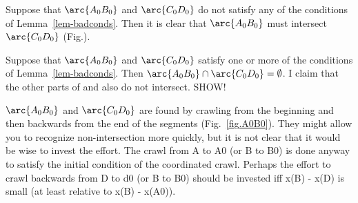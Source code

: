 {Suppose that $\arc{A_{0}B_{0}}$ and $\arc{C_{0}D_{0}}$ do not satisfy any of the 
conditions of Lemma~\ref{lem-badconds}.
Then it is clear that $\arc{A_{0}B_{0}}$ must intersect
$\arc{C_{0}D_{0}}$ (Fig.).
%
%

Suppose that $\arc{A_{0}B_{0}}$ and $\arc{C_{0}D_{0}}$ satisfy one or more of the 
conditions of Lemma~\ref{lem-badconds}.
Then $\arc{A_{0}B_{0}} \cap \arc{C_{0}D_{0}} = \emptyset$.
I claim that the other parts of  and  also do not intersect.
SHOW!
\QED

$\arc{A_{0}B_{0}}$ and $\arc{C_{0}D_{0}}$ are found by crawling from the
beginning and then backwards from the end of the segments (Fig.~\ref{fig.A0B0}).
They might allow you to recognize non-intersection more quickly, 
but it is not clear that it would be wise to invest the effort.
The crawl from A to A0 (or B to B0) is  done anyway to satisfy 
the initial condition of the coordinated crawl.
Perhaps  the effort to crawl backwards from D to d0 (or B to B0)
should be invested iff x(B) - x(D) is small (at least relative to
x(B) - x(A0)).
}

